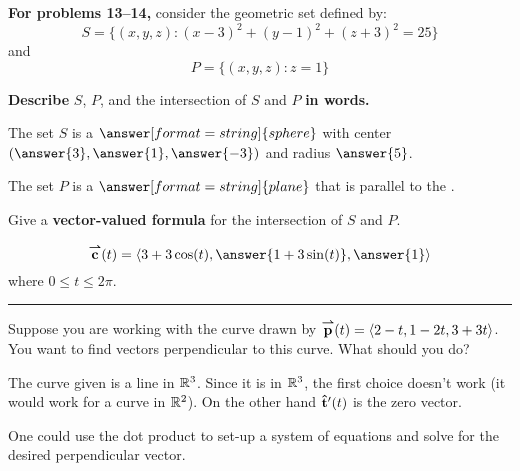 \documentclass{ximera}
\author{Bart Snapp}
\begin{document}
\textbf{For problems 13--14,} consider the geometric set defined by:
\[
S = \{(x,y,z): (x-3)^2 + (y-1)^2 + (z+3)^2 = 25\}
\]
and
\[
P = \{(x,y,z): z=1\}
\]
\begin{problem}
  \textbf{Describe} $S$, $P$, and the intersection of $S$ and $P$
  \textbf{in words.}

  \begin{prompt}
    The set $S$ is a $\answer[format=string]{sphere}$ with center $\left(\answer{3},\answer{1},\answer{-3}\right)$ and radius $\answer{5}$.

    The set $P$ is a $\answer[format=string]{plane}$ that is parallel to the .
  \end{prompt}
  
  \vfill

\end{problem}




\begin{problem}
  Give a \textbf{vector-valued formula} for the intersection of $S$ and $P$.

  \begin{prompt}
    \[
    \vec{c}(t) = \vector{3 + 3\cos(t),\answer{1+3\sin(t)}, \answer{1}}
    \]
    where $0\le t\le 2\pi$.
  \end{prompt}
  
  \vfill
  
\end{problem}

\hrule

\begin{problem}
  Suppose you are working with the curve drawn by ${\overset{\boldsymbol{\rightharpoonup}}{\mathbf{p}}}(t) =
  \left\langle 2-t,1-2t,3+3t\right\rangle$. You want to find vectors perpendicular to
  this curve. What should you do?
  \begin{multipleChoice}
  \end{multipleChoice}
  \begin{feedback}[correct]
    The curve given is a line in $\mathbb R^3$. Since it is in $\mathbb R^3$, the
    first choice doesn't work (it would work for a curve in
    $\mathbb R^2$). On the other hand $\mathbf{\hat{t}}'(t)$ is the zero vector.

    One could use the dot product to set-up a system of equations and
    solve for the desired perpendicular vector.
  \end{feedback}
\end{problem}
\end{document}
